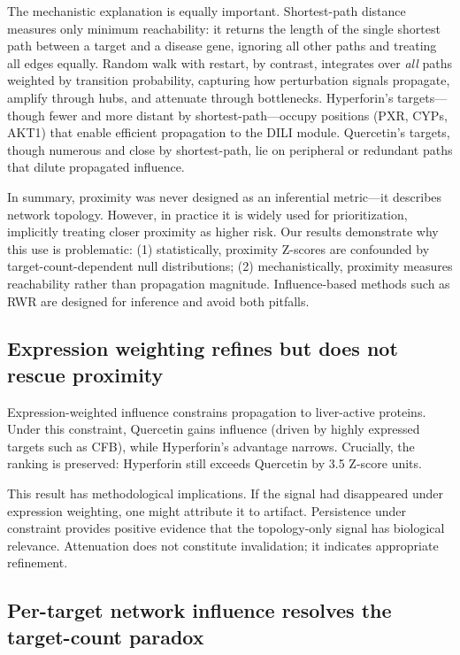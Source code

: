 The mechanistic explanation is equally important.
Shortest-path distance measures only minimum reachability: it returns the length of the single shortest path between a target and a disease gene, ignoring all other paths and treating all edges equally.
Random walk with restart, by contrast, integrates over \textit{all} paths weighted by transition probability, capturing how perturbation signals propagate, amplify through hubs, and attenuate through bottlenecks.
Hyperforin's targets---though fewer and more distant by shortest-path---occupy positions (PXR, CYPs, AKT1) that enable efficient propagation to the DILI module.
Quercetin's targets, though numerous and close by shortest-path, lie on peripheral or redundant paths that dilute propagated influence.

In summary, proximity was never designed as an inferential metric---it describes network topology.
However, in practice it is widely used for prioritization, implicitly treating closer proximity as higher risk.
Our results demonstrate why this use is problematic: (1) statistically, proximity Z-scores are confounded by target-count-dependent null distributions; (2) mechanistically, proximity measures reachability rather than propagation magnitude.
Influence-based methods such as RWR are designed for inference and avoid both pitfalls.

\subsection{Expression weighting refines but does not rescue proximity}

Expression-weighted influence constrains propagation to liver-active proteins.
Under this constraint, Quercetin gains influence (driven by highly expressed targets such as CFB), while Hyperforin's advantage narrows.
Crucially, the ranking is preserved: Hyperforin still exceeds Quercetin by 3.5 Z-score units.

This result has methodological implications.
If the signal had disappeared under expression weighting, one might attribute it to artifact.
Persistence under constraint provides positive evidence that the topology-only signal has biological relevance.
Attenuation does not constitute invalidation; it indicates appropriate refinement.

\subsection{Per-target network influence resolves the target-count paradox}


